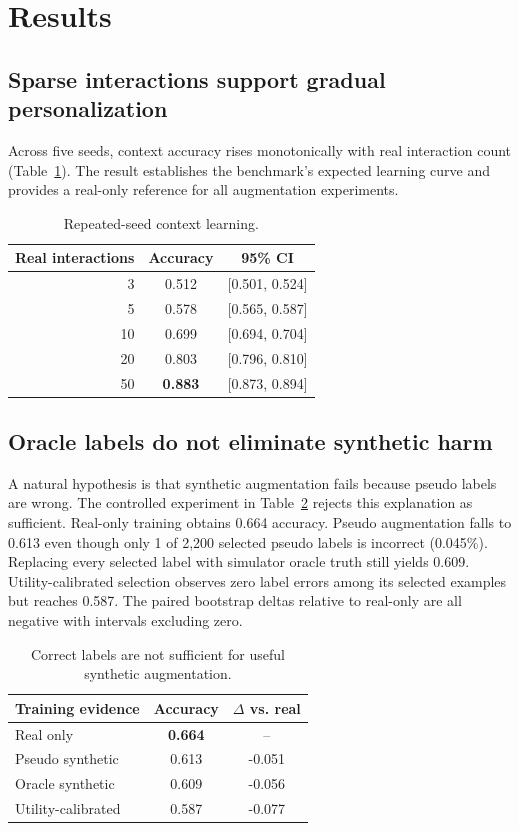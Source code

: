 \documentclass[10pt,twocolumn]{article}
\begin{document}
\section{Results}
\subsection{Sparse interactions support gradual personalization}
Across five seeds, context accuracy rises monotonically with real interaction count (Table~\ref{tab:cold}). The result establishes the benchmark's expected learning curve and provides a real-only reference for all augmentation experiments.

\begin{table}[t]
\centering\small
\begin{tabular}{rcc}\toprule
Real interactions & Accuracy & 95\% CI\\\midrule
3 & 0.512 & [0.501, 0.524]\\
5 & 0.578 & [0.565, 0.587]\\
10 & 0.699 & [0.694, 0.704]\\
20 & 0.803 & [0.796, 0.810]\\
50 & \textbf{0.883} & [0.873, 0.894]\\\bottomrule
\end{tabular}
\caption{Repeated-seed context learning.}\label{tab:cold}
\end{table}

\subsection{Oracle labels do not eliminate synthetic harm}
A natural hypothesis is that synthetic augmentation fails because pseudo labels are wrong. The controlled experiment in Table~\ref{tab:oracle} rejects this explanation as sufficient. Real-only training obtains 0.664 accuracy. Pseudo augmentation falls to 0.613 even though only 1 of 2,200 selected pseudo labels is incorrect (0.045\%). Replacing every selected label with simulator oracle truth still yields 0.609. Utility-calibrated selection observes zero label errors among its selected examples but reaches 0.587. The paired bootstrap deltas relative to real-only are all negative with intervals excluding zero.

\begin{table}[t]
\centering\small
\begin{tabular}{lcc}\toprule
Training evidence & Accuracy & $\Delta$ vs. real\\\midrule
Real only & \textbf{0.664} & --\\
Pseudo synthetic & 0.613 & -0.051\\
Oracle synthetic & 0.609 & -0.056\\
Utility-calibrated & 0.587 & -0.077\\\bottomrule
\end{tabular}
\caption{Correct labels are not sufficient for useful synthetic augmentation.}\label{tab:oracle}
\end{table}
\end{document}
